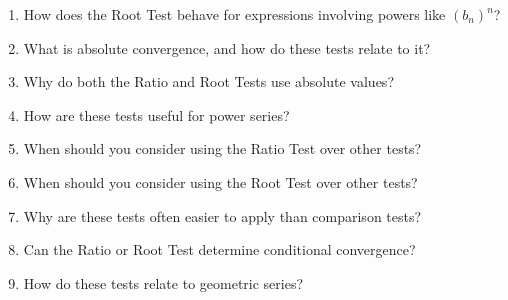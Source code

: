 \begin{enumerate}
  \item How does the Root Test behave for expressions involving powers like \((b_{n})^{n}\)?
  \item What is absolute convergence, and how do these tests relate to it?
  \item Why do both the Ratio and Root Tests use absolute values?
  \item How are these tests useful for power series?
  \item When should you consider using the Ratio Test over other tests?
  \item When should you consider using the Root Test over other tests?
  \item Why are these tests often easier to apply than comparison tests?
  \item Can the Ratio or Root Test determine conditional convergence?
  \item How do these tests relate to geometric series?
\end{enumerate}
